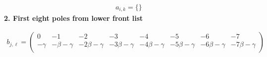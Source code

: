 \documentclass[11pt]{article}
\begin{document}
\begin{align*}
  a_{i,k} = 
  \{\}
\end{align*}
\noindent\textbf{2. First eight poles from lower front list}

\begin{align*}
  b_{j,\ell} = 
  \left(
\begin{array}{cccccccc}
 0 & -1 & -2 & -3 & -4 & -5 & -6 & -7 \\
 -\gamma  & -\beta -\gamma  & -2 \beta -\gamma  & -3 \beta -\gamma  & -4 \beta -\gamma  & -5 \beta -\gamma  & -6 \beta -\gamma  & -7 \beta -\gamma  \\
\end{array}
\right)
\end{align*}

\printbibliography[title={References}]
\end{document}
